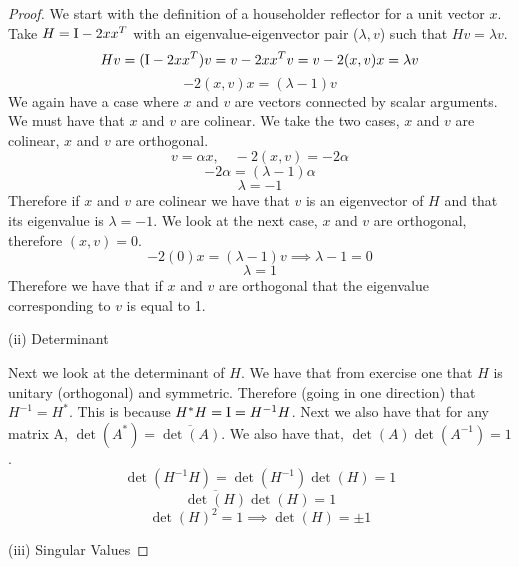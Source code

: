 \documentclass{article}
\begin{document}
\begin{enumerate}
\begin{proof}
    We start with the definition of a householder reflector for a unit vector $x$. Take $H = \mathrm{I} - 2xx^T$ with an eigenvalue-eigenvector pair ($\lambda, v$) such that $Hv = \lambda v$. 
    \[
        Hv = (\mathrm{I} - 2xx^T)v = v - 2xx^Tv = v - 2(x, v)x = \lambda v  
    \]
    \[
        -2(x, v) x = (\lambda - 1) v
    \]
    We again have a case where $x$ and $v$ are vectors connected by scalar arguments. We must have that $x$ and $v$ are colinear. We take the two cases, $x$ and $v$ are colinear, $x$ and $v$ are orthogonal. 
    \[
        v = \alpha x, \quad -2(x, v) = -2\alpha
    \]
    \[
        -2\alpha = (\lambda - 1) \alpha 
    \]
    \[
        \lambda = -1
    \]
    Therefore if $x$ and $v$ are colinear we have that $v$ is an eigenvector of $H$ and that its eigenvalue is $\lambda = -1$. We look at the next case, $x$ and $v$ are orthogonal, therefore $(x, v) = 0$. 
    \[
        -2(0)x = (\lambda - 1)v \implies \lambda - 1 = 0
    \]
    \[
        \lambda = 1 
    \]
    Therefore we have that if $x$ and $v$ are orthogonal that the eigenvalue corresponding to $v$ is equal to 1. 
    \vspace{5pt}

    (ii) Determinant 

    Next we look at the determinant of $H$. We have that from exercise one that $H$ is unitary (orthogonal) and symmetric. Therefore (going in one direction) that $H^{-1} = H^*$. This is because $H^*H = \mathrm{I} = H^{-1}H$. Next we also have that for any matrix A, $\det(A^*) = \overline{\det(A)}$. We also have that, $\det(A)\det(A^{-1}) = 1$.
    \[
        \det(H^{-1}H) = \det(H^{-1})\det(H) = 1
    \]
    \[
        \overline{\det(H)}\det(H) = 1 
    \]
    \[
        \det(H)^2 = 1 \implies \det(H) = \pm 1
    \]
    
    (iii) Singular Values


\end{proof}
\end{enumerate}
\end{document}
